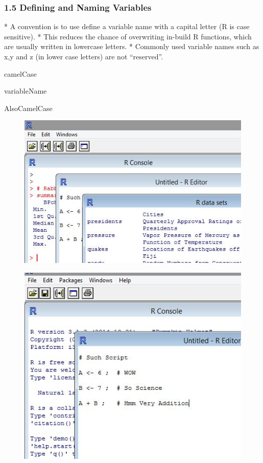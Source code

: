  \frametitle{1.5 Defining and Naming Variables}
 
*  A convention is to use define a variable name with a capital letter (R is case sensitive). 
*  This
 reduces the chance of overwriting in-build R functions, which are usually written in lowercase
 letters. 
*  Commonly used variable names such as x,y and z (in lower case letters) are not “reserved”.

 
 \begin{semiverbatim}
 camelCase
 
 variableName
 
 AlsoCamelCase
 \end{semiverbatim}
 
 
 \begin{figure}
 \centering
 \includegraphics[width=0.7\linewidth]{images/Rmultiplewindows}
 \end{figure}
 
    
 
 \begin{figure}
 \centering
 \includegraphics[width=0.7\linewidth]{images/Rscript}         
 \end{figure}
    

